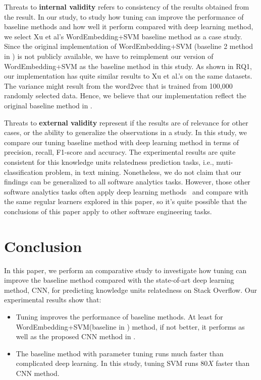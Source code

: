 \documentclass[sigconf,review, anonymous]{acmart}
\theoremstyle{break}
\newcommand{\bi}{\begin{itemize}[leftmargin=0.4cm]}
\newcommand{\ei}{\end{itemize}}
\begin{document}
Threats to \textbf{internal validity} refers to consistency of the results 
obtained from the result. In our study,  to study how
tuning can improve the performance of baseline methods and how well
it perform compared with deep learning method, we select
Xu et al's  WordEmbedding+SVM baseline method as a case study. Since the original implementation of 
WordEmbedding+SVM (baseline 2 method in \cite{xu2016predicting}) is not 
publicly available, we have to reimplement our version of WordEmbedding+SVM as
the baseline method in this study. As shown in RQ1, our implementation has
quite similar results to Xu et al.'s on the same datasets. The variance might 
result from the word2vec that is trained from 100,000 randomly selected data.
Hence, we believe that our implementation reflect the original
 baseline method in \cite{xu2016predicting}.
 
 Threats to \textbf{external validity} represent if the results are of relevance for
 other cases, or the ability to generalize the observations in a study. In this study,
 we compare our tuning baseline method with deep learning method in terms of
 precision, recall, F1-score and accuracy. The experimental results are quite consistent
 for this knowledge units relatedness prediction tasks, i.e.,  muti-classification problem, in text mining. 
 Nonetheless, we do not claim that our findings can be generalized to all software analytics tasks. 
 However, those other software analytics tasks often apply deep learning
 methods~\cite{choetkiertikul2016deep, wang2016automatically} and compare with
 the same regular learners explored in this paper, so it's quite possible that
  the conclusions of this paper apply to other software engineering tasks.
 
 


\section{Conclusion}

In this paper, we perform an comparative study to investigate
how tuning can improve the baseline method compared with
the state-of-art deep learning method, CNN, for predicting
knowledge units relatedness on Stack Overflow. Our experimental
results show that:

\bi
\item Tuning improves the performance of baseline methods. 
At least for WordEmbedding+SVM(baseline in \cite{xu2016predicting}) method, if not better,
it performs as well as the proposed CNN method in \cite{xu2016predicting}.
\item The baseline method with parameter tuning runs much faster than complicated deep learning.
In this study, tuning SVM runs $80X$ faster than CNN method.
\ei
\end{document}
